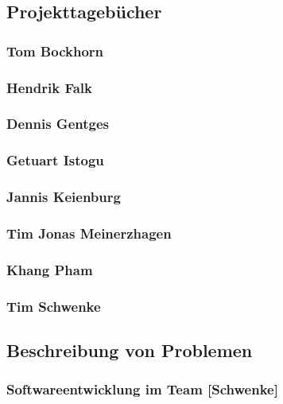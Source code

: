 \subsection{Projekttagebücher}

\subsubsection{Tom Bockhorn}

\subsubsection{Hendrik Falk}

\subsubsection{Dennis Gentges}

\subsubsection{Getuart Istogu}

\subsubsection{Jannis Keienburg}

\subsubsection{Tim Jonas Meinerzhagen}

\subsubsection{Khang Pham}

\subsubsection{Tim Schwenke}

\subsection{Beschreibung von Problemen}

\subsubsection{Softwareentwicklung im Team [Schwenke]}

